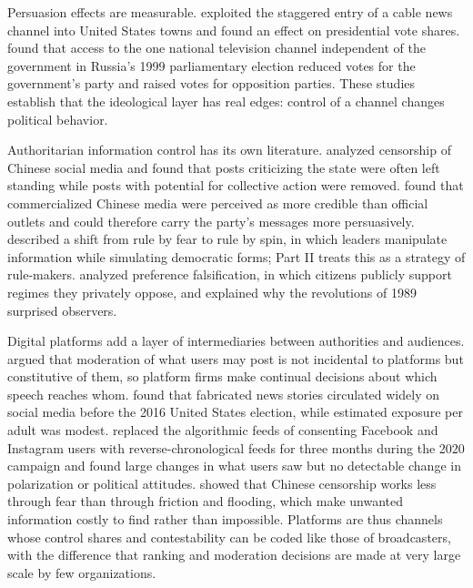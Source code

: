 \documentclass[11pt,letterpaper]{article}
\theoremstyle{definition}
\theoremstyle{remark}
\begin{document}
Persuasion effects are measurable. \citet{dellavigna2007} exploited the staggered entry of a cable news channel into United States towns and found an effect on presidential vote shares. \citet{enikolopov2011} found that access to the one national television channel independent of the government in Russia's 1999 parliamentary election reduced votes for the government's party and raised votes for opposition parties. These studies establish that the ideological layer has real edges: control of a channel changes political behavior.

Authoritarian information control has its own literature. \citet{king2013} analyzed censorship of Chinese social media and found that posts criticizing the state were often left standing while posts with potential for collective action were removed. \citet{stockmann2013} found that commercialized Chinese media were perceived as more credible than official outlets and could therefore carry the party's messages more persuasively. \citet{guriev2019,guriev2022} described a shift from rule by fear to rule by spin, in which leaders manipulate information while simulating democratic forms; Part II treats this as a strategy of rule-makers. \citet{kuran1991} analyzed preference falsification, in which citizens publicly support regimes they privately oppose, and explained why the revolutions of 1989 surprised observers.

Digital platforms add a layer of intermediaries between authorities and audiences. \citet{gillespie2019} argued that moderation of what users may post is not incidental to platforms but constitutive of them, so platform firms make continual decisions about which speech reaches whom. \citet{allcott2017} found that fabricated news stories circulated widely on social media before the 2016 United States election, while estimated exposure per adult was modest. \citet{guess2023} replaced the algorithmic feeds of consenting Facebook and Instagram users with reverse-chronological feeds for three months during the 2020 campaign and found large changes in what users saw but no detectable change in polarization or political attitudes. \citet{roberts2018} showed that Chinese censorship works less through fear than through friction and flooding, which make unwanted information costly to find rather than impossible. Platforms are thus channels whose control shares and contestability can be coded like those of broadcasters, with the difference that ranking and moderation decisions are made at very large scale by few organizations.
\end{document}
